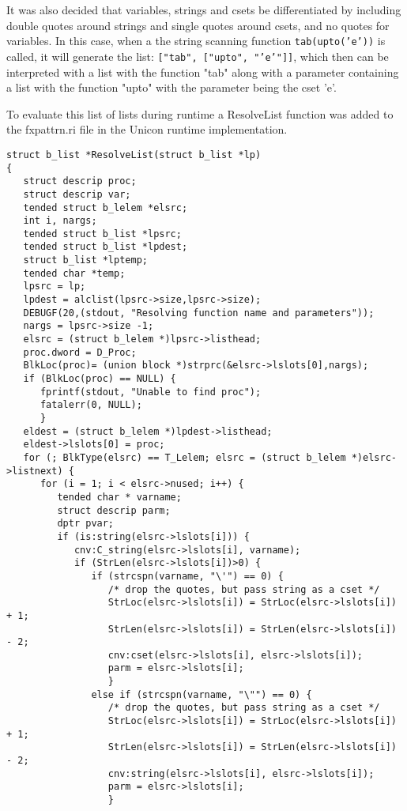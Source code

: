 \documentclass{article}
\begin{document}
It was also decided that variables, strings and csets be differentiated by including double quotes around strings and single quotes around csets, and no quotes for variables.  In this case, when a the string scanning function \texttt{tab(upto('e'))} is called, it will generate the list: \texttt{["tab", ["upto", "'e'"]]}, which then can be interpreted with a list with the function "tab" along with a parameter containing a list with the function "upto" with the parameter being the cset 'e'.

To evaluate this list of lists during runtime a ResolveList function was added to the fxpattrn.ri file in the Unicon runtime implementation.  
\begin{verbatim}
struct b_list *ResolveList(struct b_list *lp)
{
   struct descrip proc;
   struct descrip var;
   tended struct b_lelem *elsrc;
   int i, nargs;
   tended struct b_list *lpsrc;
   tended struct b_list *lpdest;
   struct b_list *lptemp;
   tended char *temp;
   lpsrc = lp;
   lpdest = alclist(lpsrc->size,lpsrc->size);
   DEBUGF(20,(stdout, "Resolving function name and parameters"));
   nargs = lpsrc->size -1;
   elsrc = (struct b_lelem *)lpsrc->listhead;
   proc.dword = D_Proc;
   BlkLoc(proc)= (union block *)strprc(&elsrc->lslots[0],nargs);
   if (BlkLoc(proc) == NULL) {
      fprintf(stdout, "Unable to find proc");
      fatalerr(0, NULL);
      }
   eldest = (struct b_lelem *)lpdest->listhead;
   eldest->lslots[0] = proc;
   for (; BlkType(elsrc) == T_Lelem; elsrc = (struct b_lelem *)elsrc->listnext) {
      for (i = 1; i < elsrc->nused; i++) {
         tended char * varname;
         struct descrip parm;
         dptr pvar;
         if (is:string(elsrc->lslots[i])) {
            cnv:C_string(elsrc->lslots[i], varname);
            if (StrLen(elsrc->lslots[i])>0) {
               if (strcspn(varname, "\'") == 0) { 
                  /* drop the quotes, but pass string as a cset */
                  StrLoc(elsrc->lslots[i]) = StrLoc(elsrc->lslots[i]) + 1;
                  StrLen(elsrc->lslots[i]) = StrLen(elsrc->lslots[i]) - 2;
                  cnv:cset(elsrc->lslots[i], elsrc->lslots[i]);
                  parm = elsrc->lslots[i];
                  }
               else if (strcspn(varname, "\"") == 0) {
                  /* drop the quotes, but pass string as a cset */
                  StrLoc(elsrc->lslots[i]) = StrLoc(elsrc->lslots[i]) + 1;
                  StrLen(elsrc->lslots[i]) = StrLen(elsrc->lslots[i]) - 2;
                  cnv:string(elsrc->lslots[i], elsrc->lslots[i]);
                  parm = elsrc->lslots[i];
                  }

\end{verbatim}
\end{document}

